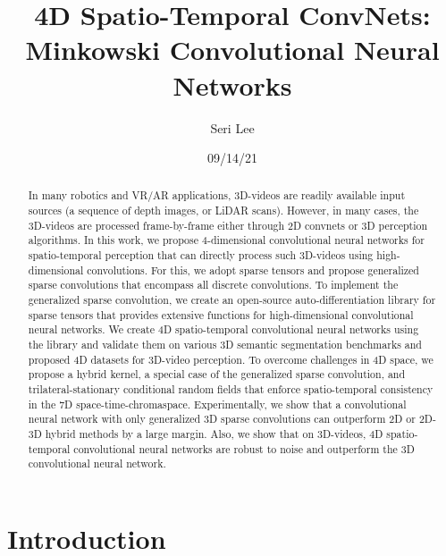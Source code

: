 \documentclass[12pt]{article}
\begin{document}
\title{4D Spatio-Temporal ConvNets: Minkowski Convolutional Neural Networks}
\author{Seri Lee}
\date{09/14/21}

\maketitle

\begin{abstract}
In many robotics and VR/AR applications, 3D-videos are readily available input sources (a sequence of depth images, or LiDAR scans). However, in many cases, the 3D-videos are processed frame-by-frame either through 2D convnets or 3D perception algorithms. In this work, we propose 4-dimensional convolutional neural networks for spatio-temporal perception that can directly process such 3D-videos using high-dimensional convolutions. For this, we adopt sparse tensors and propose generalized sparse convolutions that encompass all discrete convolutions. To implement the generalized sparse convolution, we create an open-source auto-differentiation library for sparse tensors that provides extensive functions for high-dimensional convolutional neural networks. We create 4D spatio-temporal convolutional neural networks using the library and validate them on various 3D semantic segmentation benchmarks and proposed 4D datasets for 3D-video perception. To overcome challenges in 4D space, we propose a hybrid kernel, a special case of the generalized sparse convolution, and trilateral-stationary conditional random fields that enforce spatio-temporal consistency in the 7D space-time-chromaspace. Experimentally, we show that a convolutional neural network with only generalized 3D sparse convolutions can outperform 2D or 2D-3D hybrid methods by a large margin. Also, we show that on 3D-videos, 4D spatio-temporal convolutional neural networks are robust to noise and outperform the 3D convolutional neural network. 
\end{abstract}

\section{Introduction}
\end{document}

